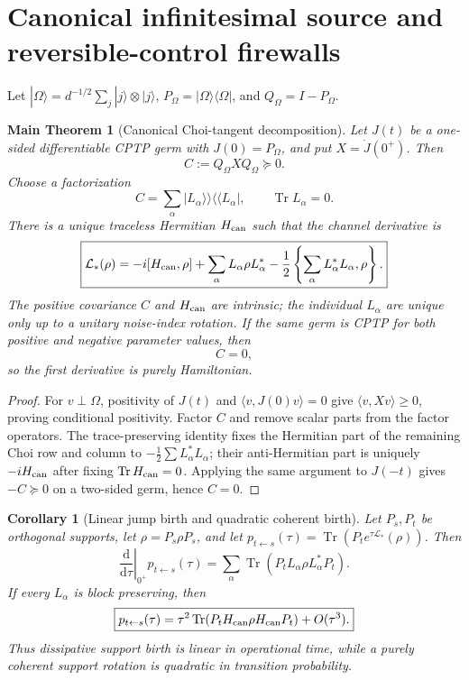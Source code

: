 \documentclass[11pt,oneside,openany]{book}
\numberwithin{equation}{chapter}
\newtheorem{corollary}[theorem]{Corollary}
\newtheorem{maintheorem}[theorem]{Main Theorem}
\theoremstyle{definition}
\theoremstyle{remark}
\newcommand{\Tr}{\operatorname{Tr}}
\newcommand{\dd}{\mathrm d}
\begin{document}
\section{Canonical infinitesimal source and reversible-control firewalls}

Let \(|\Omega\rangle=d^{-1/2}\sum_j|j\rangle\otimes|j\rangle\),
\(P_\Omega=|\Omega\rangle\langle\Omega|\), and
\(Q_\Omega=I-P_\Omega\).

\begin{maintheorem}[Canonical Choi-tangent decomposition]
\label{thm:v6-choi-tangent}
Let \(J(t)\) be a one-sided differentiable CPTP germ with
\(J(0)=P_\Omega\), and put \(X=\dot J(0^+)\).  Then
\[
 \boxed{C:=Q_\Omega XQ_\Omega\succeq0.}
\]
Choose a factorization
\[
 C=\sum_\alpha|L_\alpha\rangle\!\rangle
 \langle\!\langle L_\alpha|,
 \qquad \Tr L_\alpha=0.
\]
There is a unique traceless Hermitian \(H_{\rm can}\) such that the channel
derivative is
\[
 \boxed{
 \mathcal L_*(\rho)
 =-i[H_{\rm can},\rho]
 +\sum_\alpha L_\alpha\rho L_\alpha^*
 -\frac12\left\{\sum_\alpha L_\alpha^*L_\alpha,\rho\right\}.}
\]
The positive covariance \(C\) and \(H_{\rm can}\) are intrinsic; the
individual \(L_\alpha\) are unique only up to a unitary noise-index rotation.
If the same germ is CPTP for both positive and negative parameter values, then
\[
 \boxed{C=0,}
\]
so the first derivative is purely Hamiltonian.
\end{maintheorem}

\begin{proof}
For \(v\perp\Omega\), positivity of \(J(t)\) and
\(\langle v,J(0)v\rangle=0\) give
\(\langle v,Xv\rangle\ge0\), proving conditional positivity.  Factor
\(C\) and remove scalar parts from the factor operators.  The trace-preserving
identity fixes the Hermitian part of the remaining Choi row and column to
\(-\frac12\sum L_\alpha^*L_\alpha\); their anti-Hermitian part is uniquely
\(-iH_{\rm can}\) after fixing \(\Tr H_{\rm can}=0\).  Applying the same
argument to \(J(-t)\) gives \(-C\succeq0\) on a two-sided germ, hence
\(C=0\).
\end{proof}

\begin{corollary}[Linear jump birth and quadratic coherent birth]
\label{cor:v6-birth-orders}
Let \(P_s,P_t\) be orthogonal supports, let
\(\rho=P_s\rho P_s\), and let
\(p_{t\leftarrow s}(\tau)=\Tr(P_t e^{\tau\mathcal L_*}(\rho))\).
Then
\[
 \left.\frac{\dd}{\dd\tau}\right|_{0^+}p_{t\leftarrow s}(\tau)
 =\sum_\alpha\Tr(P_tL_\alpha\rho L_\alpha^*P_t).
\]
If every \(L_\alpha\) is block preserving, then
\[
 \boxed{
 p_{t\leftarrow s}(\tau)
 =\tau^2\Tr(P_tH_{\rm can}\rho H_{\rm can}P_t)+O(\tau^3).}
\]
Thus dissipative support birth is linear in operational time, while a purely
coherent support rotation is quadratic in transition probability.
\end{corollary}
\end{document}
